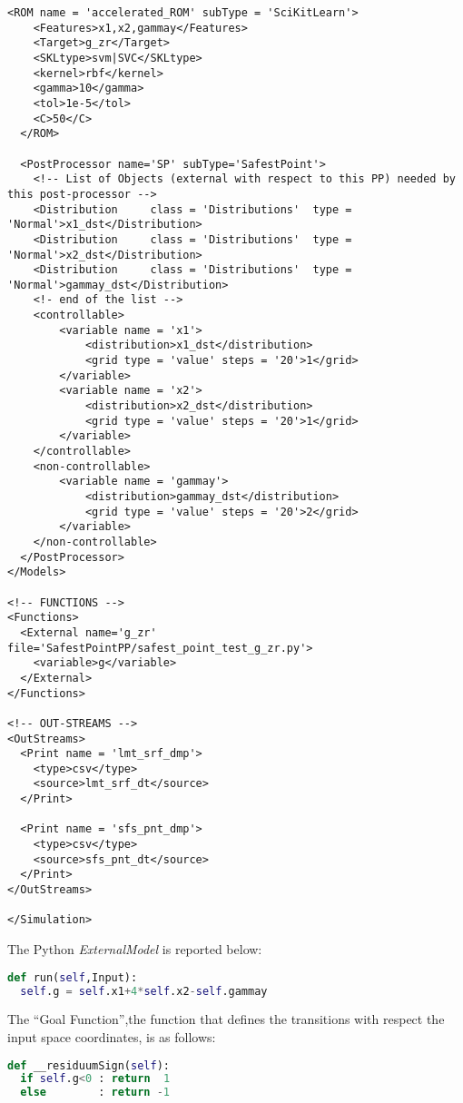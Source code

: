 \begin{lstlisting}[style=XML,morekeywords={debug,re,seeding,class,subType,limit}]
  <ROM name = 'accelerated_ROM' subType = 'SciKitLearn'>
    <Features>x1,x2,gammay</Features>
    <Target>g_zr</Target>
    <SKLtype>svm|SVC</SKLtype>
    <kernel>rbf</kernel>
    <gamma>10</gamma>
    <tol>1e-5</tol>
    <C>50</C>
  </ROM>

  <PostProcessor name='SP' subType='SafestPoint'>
    <!-- List of Objects (external with respect to this PP) needed by this post-processor -->
    <Distribution     class = 'Distributions'  type = 'Normal'>x1_dst</Distribution>
    <Distribution     class = 'Distributions'  type = 'Normal'>x2_dst</Distribution>
    <Distribution     class = 'Distributions'  type = 'Normal'>gammay_dst</Distribution>
    <!- end of the list -->
    <controllable>
    	<variable name = 'x1'>
    		<distribution>x1_dst</distribution>
    		<grid type = 'value' steps = '20'>1</grid>
    	</variable>
    	<variable name = 'x2'>
    		<distribution>x2_dst</distribution>
    		<grid type = 'value' steps = '20'>1</grid>
    	</variable>
    </controllable>
    <non-controllable>
    	<variable name = 'gammay'>
    		<distribution>gammay_dst</distribution>
    		<grid type = 'value' steps = '20'>2</grid>
    	</variable>
    </non-controllable>
  </PostProcessor>
</Models>

<!-- FUNCTIONS -->
<Functions>
  <External name='g_zr' file='SafestPointPP/safest_point_test_g_zr.py'>
    <variable>g</variable>
  </External>
</Functions>

<!-- OUT-STREAMS -->
<OutStreams>
  <Print name = 'lmt_srf_dmp'>
  	<type>csv</type>
  	<source>lmt_srf_dt</source>
  </Print>

  <Print name = 'sfs_pnt_dmp'>
  	<type>csv</type>
  	<source>sfs_pnt_dt</source>
  </Print>
</OutStreams>

</Simulation>
\end{lstlisting}
The Python \textit{ExternalModel} is reported below:
\begin{lstlisting}[language=python]
def run(self,Input):
  self.g = self.x1+4*self.x2-self.gammay
\end{lstlisting}
The ``Goal Function'',the function that defines the transitions with respect the input space coordinates, is as follows:
\begin{lstlisting}[language=python]
def __residuumSign(self):
  if self.g<0 : return  1
  else        : return -1
\end{lstlisting}


